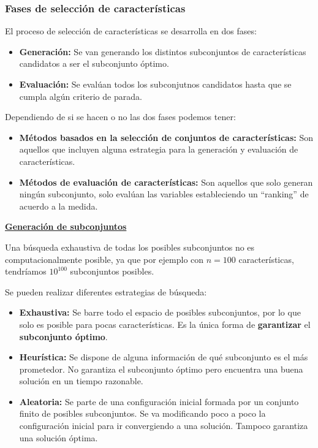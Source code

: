 \documentclass[12pt, letterpaper]{article}
\begin{document}
\subsubsection{Fases de selección de características}
El proceso de selección de características se desarrolla en dos fases:
\begin{itemize}
    \item \textbf{Generación:} Se van generando los distintos subconjuntos de características candidatos a ser el subconjunto óptimo.
    \item \textbf{Evaluación:} Se evalúan todos los subconjutnos candidatos hasta que se cumpla algún criterio de parada.
\end{itemize}

Dependiendo de si se hacen o no las dos fases podemos tener:
\begin{itemize}
    \item \textbf{Métodos basados en la selección de conjuntos de características:} Son aquellos que incluyen alguna estrategia para la generación y evaluación de características.
    \item \textbf{Métodos de evaluación de características:} Son aquellos que solo generan ningún subconjunto, solo evalúan las variables estableciendo un ``ranking'' de acuerdo a la medida.
\end{itemize}

\vspace{1 em}
\textbf{\underline{Generación de subconjuntos}}

Una búsqueda exhaustiva de todas los posibles subconjuntos no es computacionalmente posible, ya que por ejemplo con $n = 100$ características, \linebreak tendríamos $10^{100}$ subconjuntos posibles.

Se pueden realizar diferentes estrategias de búsqueda:
\begin{itemize}
    \item \textbf{Exhaustiva:} Se barre todo el espacio de posibles subconjuntos, por lo que solo es posible para pocas características. Es la única forma de \textbf{garantizar} el \textbf{subconjunto óptimo}.
    \item \textbf{Heurística:} Se dispone de alguna información de qué subconjunto es el más prometedor. No garantiza el subconjunto óptimo pero encuentra una buena solución en un tiempo razonable.
    \item \textbf{Aleatoria:} Se parte de una configuración inicial formada por un conjunto finito de posibles subconjuntos. Se va modificando poco a poco la configuración inicial para ir convergiendo a una solución. Tampoco garantiza una solución óptima.
\end{itemize}
\end{document}
